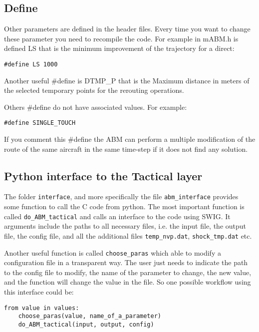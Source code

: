 \documentclass[12pt]{article}
\begin{document}
\subsection{Define}

Other parameters are defined in the header files. Every time you want to change these parameter you need to recompile the code. For example in mABM.h is defined LS that is the minimum improvement of the trajectory for a direct:
\begin{verbatim}
#define LS 1000
\end{verbatim}

Another useful \#define is DTMP\_P that is the Maximum distance in meters of the selected temporary points for the rerouting operations.

Others \#define do not have associated values. For example:
\begin{verbatim}
#define SINGLE_TOUCH
\end{verbatim}

If you comment this \#define the ABM can perform a multiple modification of the route of the same aircraft in the same time-step if it does not find any solution.

\subsection{Python interface to the Tactical layer}
\label{subsec:interface}

The folder \verb|interface|, and more specifically the file \verb|abm_interface| provides some function to call the C code from python. The most important function is called \verb|do_ABM_tactical| and calls an interface to the code using SWIG. It arguments include the paths to all necessary files, i.e. the input file, the output file, the config file, and all the additional files \verb|temp_nvp.dat|, \verb|shock_tmp.dat| etc.

Another useful function is called \verb|choose_paras| which able to modify a configuration file in a transparent way. The user just needs to indicate the path to the config file to modify, the name of the parameter to change, the new value, and the function will change the value in the file. So one possible workflow using this interface could be:

\begin{verbatim}
from value in values:
    choose_paras(value, name_of_a_parameter)
    do_ABM_tactical(input, output, config)
\end{verbatim} 
\end{document}
